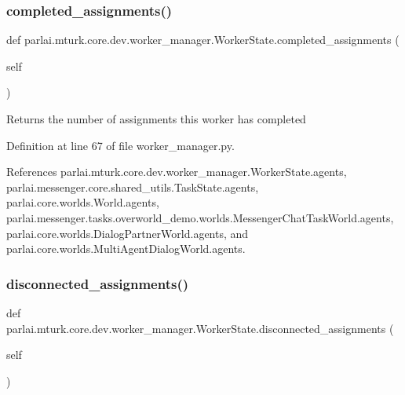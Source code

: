 \subsubsection{\texorpdfstring{completed\+\_\+assignments()}{completed\_assignments()}}
{\footnotesize\ttfamily def parlai.\+mturk.\+core.\+dev.\+worker\+\_\+manager.\+Worker\+State.\+completed\+\_\+assignments (\begin{DoxyParamCaption}\item[{}]{self }\end{DoxyParamCaption})}

\begin{DoxyVerb}Returns the number of assignments this worker has completed\end{DoxyVerb}
 

Definition at line 67 of file worker\+\_\+manager.\+py.



References parlai.\+mturk.\+core.\+dev.\+worker\+\_\+manager.\+Worker\+State.\+agents, parlai.\+messenger.\+core.\+shared\+\_\+utils.\+Task\+State.\+agents, parlai.\+core.\+worlds.\+World.\+agents, parlai.\+messenger.\+tasks.\+overworld\+\_\+demo.\+worlds.\+Messenger\+Chat\+Task\+World.\+agents, parlai.\+core.\+worlds.\+Dialog\+Partner\+World.\+agents, and parlai.\+core.\+worlds.\+Multi\+Agent\+Dialog\+World.\+agents.

\mbox{\label{classparlai_1_1mturk_1_1core_1_1dev_1_1worker__manager_1_1WorkerState_a484636b6cf7e2bd4772369345d3854fe}} 
\subsubsection{\texorpdfstring{disconnected\+\_\+assignments()}{disconnected\_assignments()}}
{\footnotesize\ttfamily def parlai.\+mturk.\+core.\+dev.\+worker\+\_\+manager.\+Worker\+State.\+disconnected\+\_\+assignments (\begin{DoxyParamCaption}\item[{}]{self }\end{DoxyParamCaption})}

